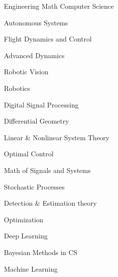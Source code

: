 
\begin{cventries}

  \cventrycol
  {Engineering}
  {Math}
  {Computer Science}
  {
    \begin{cvitems}
      \item {Autonomous Systems}
      \item {Flight Dynamics and Control}
      \item {Advanced Dynamics}
      \item {Robotic Vision}
      \item {Robotics}
      \item {Digital Signal Processing}
    \end{cvitems}
  }
  {
    \begin{cvitems}
      \item {Differential Geometry}
      \item {Linear \& Nonlinear System Theory}
      \item {Optimal Control}
      \item {Math of Signals and Systems}
      \item {Stochastic Processes}
      \item {Detection \& Estimation theory}
      \item {Optimization}
    \end{cvitems}
  }
  {
    \begin{cvitems}
      \item {Deep Learning}
      \item {Bayesian Methods in CS}
      \item {Machine Learning}
    \end{cvitems}
  }

\end{cventries}

